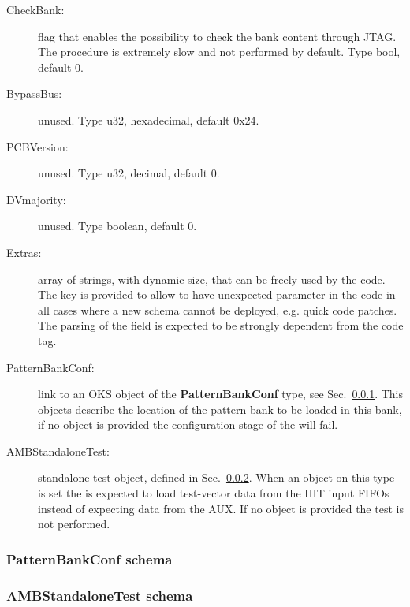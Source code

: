 \begin{description}
\item[CheckBank:] flag that enables the possibility to check the bank content
through JTAG. The procedure is extremely slow and not performed by default.
Type bool, default 0.

\item[BypassBus:] unused. Type u32, hexadecimal, default 0x24.

\item[PCBVersion:] unused. Type u32, decimal, default 0.

\item[DVmajority:] unused. Type boolean, default 0.

\item[Extras:] array of strings, with dynamic size, that can be freely used by the code.
The key is provided to allow to have unexpected parameter in the code in all cases
where a new schema cannot be deployed, e.g. quick code patches. The parsing of the
field is expected to be strongly dependent from the code tag.

\item[PatternBankConf:] link to an OKS object of the \textbf{PatternBankConf} type,
see Sec.~\ref{sec:pattbankschema}. This objects describe the location of the pattern
bank to be loaded in this bank, if no object is provided the configuration stage
of the \RCModule will fail.

\item[AMBStandaloneTest:] standalone test object, defined in Sec.~\ref{sec:ambtestschema}.
When an object on this type is set the \AMBoard is expected to load test-vector
data from the HIT input FIFOs instead of expecting data from the AUX. If no
object is provided the test is not performed.
\end{description}


\subsubsection{PatternBankConf schema}
\label{sec:pattbankschema}

\subsubsection{AMBStandaloneTest schema}
\label{sec:ambtestschema}